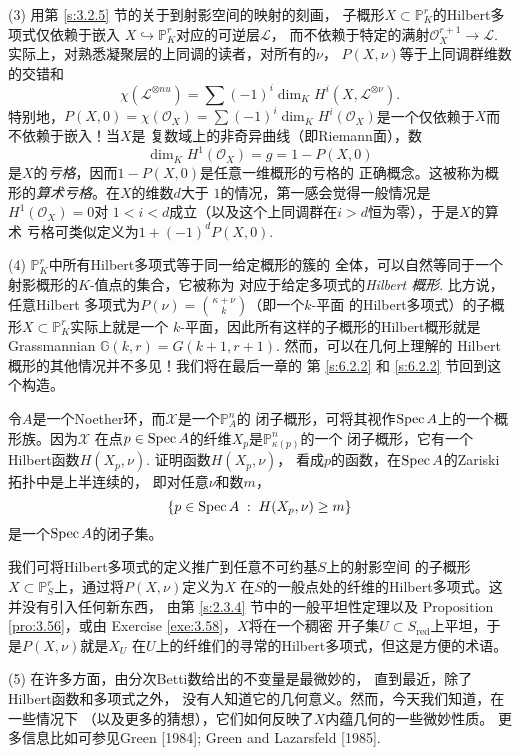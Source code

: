 (3) 用第 \ref{s:3.2.5} 节的关于到射影空间的映射的刻画，
子概形$X\subset \mathbb P_K^r$的Hilbert多项式仅依赖于嵌入
$X\hookrightarrow \mathbb P_K^r$对应的可逆层$\mathscr L$，
而不依赖于特定的满射$\mathscr O_X^{r+1}\to \mathscr L$. 
实际上，对熟悉凝聚层的上同调的读者，对所有的$\nu$，
$P(X,\nu)$等于上同调群维数的交错和
\[
  \chi(\mathscr L^{\otimes nu})=\sum (-1)^i \dim_K H^i
  (X,\mathscr L^{\otimes \nu}).
\]
特别地，$P(X,0)=\chi(\mathscr O_X)=\sum (-1)^i \dim_K
H^i(\mathscr O_X)$是一个仅依赖于$X$而不依赖于嵌入！当$X$是
复数域上的非奇异曲线（即Riemann面），数
\[
  \dim_K H^1(\mathscr O_X)=g=1-P(X,0)
\]
是$X$的\textit{亏格}，因而$1-P(X,0)$是任意一维概形的亏格的
正确概念。这被称为概形的\textit{算术亏格}。在$X$的维数$d$大于
$1$的情况，第一感会觉得一般情况是$H^1(\mathscr O_X)=0$对
$1< i < d$成立（以及这个上同调群在$i>d$恒为零），于是$X$的算术
亏格可类似定义为$1+(-1)^d P(X,0)$.

(4) $\mathbb P_K^r$中所有Hilbert多项式等于同一给定概形的簇的
全体，可以自然等同于一个射影概形的$K$-值点的集合，它被称为
对应于给定多项式的\textit{Hilbert 概形}. 比方说，任意Hilbert
多项式为$P(\nu)=\binom{\kappa+\nu}{k}$（即一个$k$-平面
的Hilbert多项式）的子概形$X\subset \mathbb P_K^r$实际上就是一个
$k$-平面，因此所有这样的子概形的Hilbert概形就是Grassmannian %
$\mathbb G(k,r)=G(k+1,r+1)$. 然而，可以在几何上理解的
Hilbert概形的其他情况并不多见！我们将在最后一章的
第 \ref{s:6.2.2} 和 \ref{s:6.2.2} 节回到这个构造。

\begin{exe}\label{exe:3.58}
令$A$是一个Noether环，而$\mathscr X$是一个$\mathbb P_A^n$的
闭子概形，可将其视作$\operatorname{Spec} A$上的一个概形族。因为$\mathscr X$
在点$p\in \operatorname{Spec} A$的纤维$X_p$是$\mathbb P_{\kappa(p)}^n$的一个
闭子概形，它有一个Hilbert函数$H(X_p,\nu)$. 证明函数$H(X_p,\nu)$，
看成$p$的函数，在$\operatorname{Spec} A$的Zariski拓扑中是上半连续的，
即对任意$\nu$和数$m$，
\[
	\{p\in \operatorname{Spec} A\;:\; H(X_p,\nu)\geq m\}
\]
是一个$\operatorname{Spec} A$的闭子集。
\end{exe}

我们可将Hilbert多项式的定义推广到任意不可约基$S$上的射影空间
的子概形$X\subset \mathbb P_S^r$上，通过将$P(X,\nu)$定义为$X$
在$S$的一般点处的纤维的Hilbert多项式。这并没有引入任何新东西，
由第 \ref{s:2.3.4} 节中的一般平坦性定理以及 Proposition 
\ref{pro:3.56}，或由 Exercise \ref{exe:3.58}，$X$将在一个稠密
开子集$U\subset S_{\text{red}}$上平坦，于是$P(X,\nu)$就是$X_U$
在$U$上的纤维们的寻常的Hilbert多项式，但这是方便的术语。

(5) 在许多方面，由分次Betti数给出的不变量是最微妙的，
直到最近，除了Hilbert函数和多项式之外，
没有人知道它的几何意义。然而，今天我们知道，在一些情况下
（以及更多的猜想），它们如何反映了$X$内蕴几何的一些微妙性质。
更多信息比如可参见Green [1984]; Green and Lazarsfeld [1985].

